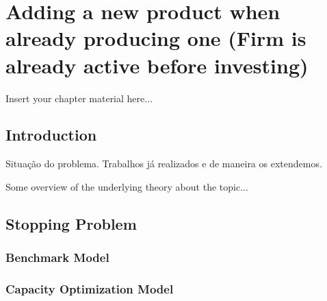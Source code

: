 
\chapter{Adding a new product when already producing one (Firm is already active before investing)}
\label{chapter:2}


Insert your chapter material here...

\section{Introduction}
\label{section:2_intro}

Situação do problema.
Trabalhos já realizados e de maneira os extendemos.

Some overview of the underlying theory about the topic...


\section{Stopping Problem}
\label{section:2_theory}



\subsection{Benchmark Model}
\label{subsec:2_bm}

\subsection{Capacity Optimization Model}
\label{subsec:2_com}





